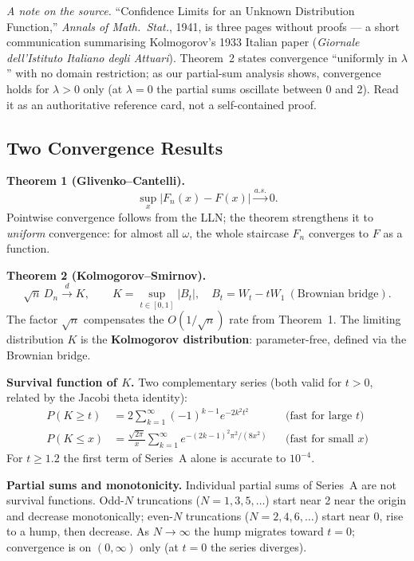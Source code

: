 \documentclass[11pt, a4paper]{article}
\begin{document}
\textit{A note on the source.}
``Confidence Limits for an Unknown Distribution Function,''
\textit{Annals of Math.\ Stat.}, 1941, is three pages without proofs --- a short
communication summarising Kolmogorov's 1933 Italian paper
(\textit{Giornale dell'Istituto Italiano degli Attuari}).
Theorem~2 states convergence ``uniformly in $\lambda$'' with no domain restriction;
as our partial-sum analysis shows, convergence holds for $\lambda>0$ only
(at $\lambda=0$ the partial sums oscillate between 0 and 2).
Read it as an authoritative reference card, not a self-contained proof.

\subsection{Two Convergence Results}

\textbf{Theorem 1 (Glivenko--Cantelli).}
\[
  \sup_x |F_n(x) - F(x)| \xrightarrow{a.s.} 0.
\]
Pointwise convergence follows from the LLN; the theorem strengthens it to
\emph{uniform} convergence: for almost all $\omega$, the whole staircase $F_n$
converges to $F$ as a function.

\textbf{Theorem 2 (Kolmogorov--Smirnov).}
\[
  \sqrt{n}\,D_n \xrightarrow{d} K, \qquad
  K = \sup_{t\in[0,1]}|B_t|, \quad B_t = W_t - t W_1\ (\text{Brownian bridge}).
\]
The factor $\sqrt{n}$ compensates the $O(1/\sqrt{n})$ rate from Theorem~1.
The limiting distribution $K$ is the \textbf{Kolmogorov distribution}: parameter-free,
defined via the Brownian bridge.

\textbf{Survival function of $K$.}
Two complementary series (both valid for $t>0$, related by the Jacobi theta identity):
\begin{align*}
  P(K \geq t) &= 2\sum_{k=1}^{\infty}(-1)^{k-1}e^{-2k^2t^2}
    && \text{(fast for large }t\text{)} \\
  P(K \leq x) &= \frac{\sqrt{2\pi}}{x}\sum_{k=1}^{\infty}e^{-(2k-1)^2\pi^2/(8x^2)}
    && \text{(fast for small }x\text{)}
\end{align*}
For $t \geq 1.2$ the first term of Series~A alone is accurate to $10^{-4}$.

\textbf{Partial sums and monotonicity.}
Individual partial sums of Series~A are not survival functions.
Odd-$N$ truncations ($N=1,3,5,\ldots$) start near 2 near the origin and decrease
monotonically; even-$N$ truncations ($N=2,4,6,\ldots$) start near 0, rise to a hump,
then decrease.
As $N\to\infty$ the hump migrates toward $t=0$; convergence is on $(0,\infty)$
only (at $t=0$ the series diverges).
\end{document}
